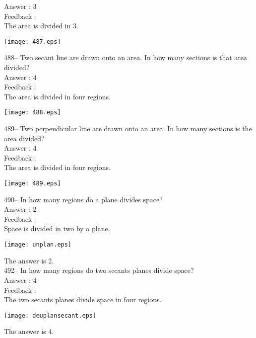 \documentclass[letterpaper, 12pt]{article}
\begin{document}
Answer : 3\\

Feedback : \\
The area is divided in 3.\\
\begin{center}
\texttt{[image: 487.eps]}
\end{center}

488-- Two secant line are drawn onto an area. In how many sections is that area divided?\\

Answer : 4\\

Feedback : \\
The area is divided in four regions.\\
\begin{center}
\texttt{[image: 488.eps]}
\end{center}

489-- Two perpendicular line are drawn onto an area. In how many sections is the area divided?\\

Answer : 4\\

Feedback :\\
The area is divided in four regions.\\
\begin{center}
\texttt{[image: 489.eps]}
\end{center}


490-- In how many regions do a plane divides space?\\

Answer : 2\\

Feedback : \\
Space is divided in two by a plane.\\
    \begin{center}
    \texttt{[image: unplan.eps]}
    \end{center}

The answer is 2.\\


492-- In how many regions do two secants planes divide space?\\

Answer : 4\\

Feedback :\\
The two secants planes divide space in four regions.\\
    \begin{center}
    \texttt{[image: deuplansecant.eps]}
    \end{center}
The answer is 4.\\
\end{document}
